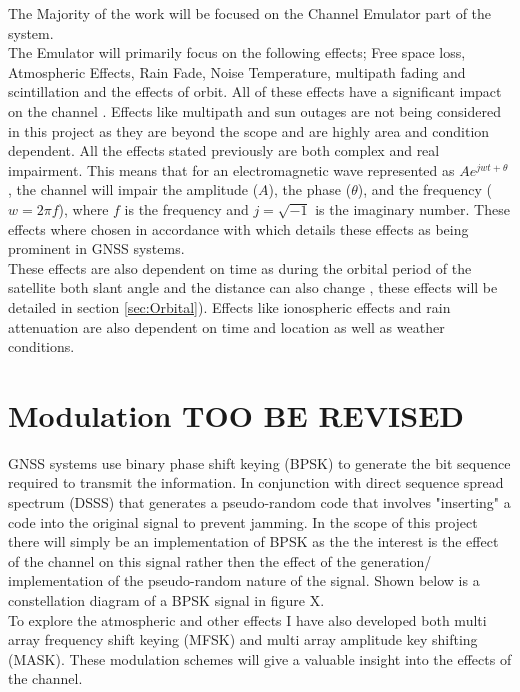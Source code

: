 \documentclass[conference]{IEEEtran}
\begin{document}
The Majority of the work will be focused on the Channel Emulator part of the system.\\

The Emulator will primarily focus on the following effects; Free space loss, Atmospheric Effects, Rain Fade, Noise Temperature, multipath fading and scintillation and the effects of orbit. All of these effects have a significant impact on the channel \cite{kaplan_understanding_2017}. Effects like multipath and sun outages are not being considered in this project as they are beyond the scope and are highly area and condition dependent. All the effects stated previously are both complex and real impairment. This means that for an electromagnetic wave represented as $Ae^{j w t+\theta}$, the channel will impair the amplitude ($A$), the phase ($\theta$), and the frequency ($w = 2\pi f$), where $f$ is the frequency and $j= \sqrt{-1}$ is the imaginary number. These effects where chosen in accordance with \cite{kaplan_understanding_2017} which details these effects as being prominent in GNSS systems.\\

These effects are also dependent on time as during the orbital period of the satellite both slant angle \cite{seybold_introduction_2005} and the distance can also change \cite{10.5555/2601574}, these effects will be detailed in section \ref{sec:Orbital}). Effects like ionospheric effects and rain attenuation are also dependent on time and location as well as weather conditions.
\label{sec:intro}


\section{Modulation TOO BE REVISED}
GNSS systems use binary phase shift keying (BPSK) to generate the bit sequence required to transmit the information. In conjunction with direct sequence spread spectrum (DSSS) that generates a pseudo-random code that involves "inserting" a code into the original signal to prevent jamming. In the scope of this project there will simply be an implementation of BPSK as the the interest is the effect of the channel on this signal rather then the effect of the generation/ implementation of the pseudo-random nature of the signal. Shown below is a constellation diagram of a BPSK signal in figure X.\\

To explore the atmospheric and other effects I have also developed both multi array frequency shift keying (MFSK) and multi array amplitude key shifting (MASK). These modulation schemes will give a valuable insight into the effects of the channel. 
\label{sec:Modulation}
\end{document}
